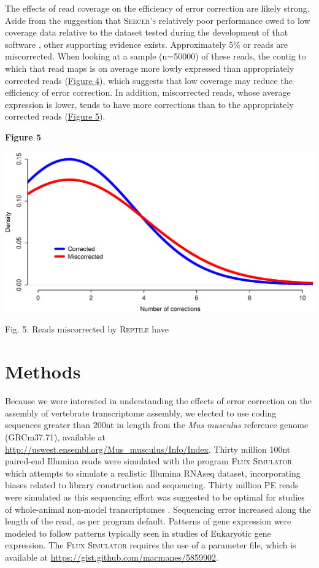 \documentclass[11pt]{article}
\begin{document}
\noindent
The effects of read coverage on the efficiency of error correction are likely strong.  Aside from the suggestion that \textsc{Seecer's} relatively poor performance owed to low coverage data relative to the dataset tested during the development of that software \citep{Le:2013dy}, other supporting evidence exists.  Approximately 5\% or reads are miscorrected.  When looking at a sample (n=50000) of these reads, the contig to which that read maps is on average more lowly expressed than appropriately corrected reads (\hyperlink{Figure 4}{Figure 4}), which suggests that low coverage may reduce the efficiency of error correction. In addition, miscorrected reads, whose average expression is lower, tends to have more corrections than to the appropriately corrected reads (\hyperlink{Figure 5}{Figure 5}).

\textbf{\hypertarget{Figure 5}{Figure 5}} \\
\centerline{\includegraphics[width=20.0\baselineskip]{FigX.eps}}

\noindent
\begin{changemargin}{2cm}{2cm}
Fig. 5. Reads miscorrected by \textsc{Reptile} have
\end{changemargin}
\vspace{10mm}



\section*{Methods}
Because we were interested in understanding the effects of error correction on the assembly of vertebrate transcriptome assembly, we elected to use coding sequences greater than 200nt in length from the \textit{Mus musculus} reference genome (GRCm37.71), available at \url{http://uswest.ensembl.org/Mus_musculus/Info/Index}.  Thirty million 100nt paired-end Illumina reads were simulated with the program \textsc{Flux Simulator} \citep{Griebel:2012ti} which attempts to simulate a realistic Illumina RNAseq dataset, incorporating biases related to library construction and sequencing. Thirty million PE reads were simulated as this sequencing effort was suggested to be optimal for studies of whole-animal non-model transcriptomes \citep{Francis:2013gc}. Sequencing error increased along the length of the read, as per program default. Patterns of gene expression were modeled to follow patterns typically seen in studies of Eukaryotic gene expression. The \textsc{Flux Simulator} requires the use of a parameter file, which is available at \url{https://gist.github.com/macmanes/5859902}.  \\
\end{document}
